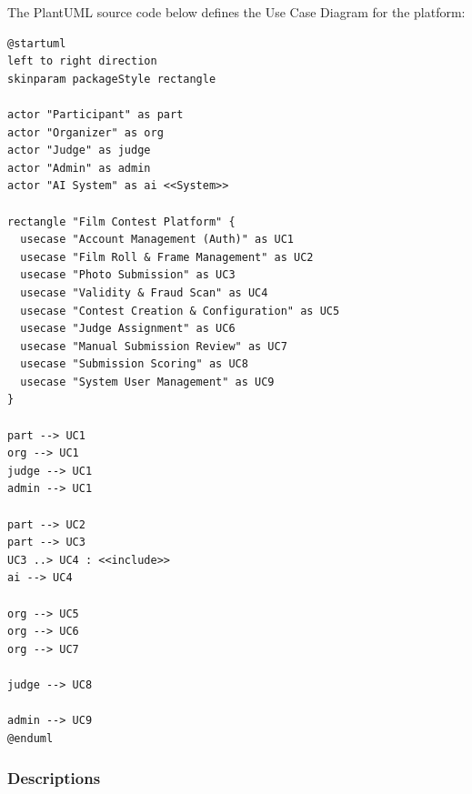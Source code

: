 \documentclass[12pt,a4paper]{article}
\begin{document}
The PlantUML source code below defines the Use Case Diagram for the platform:

\begin{lstlisting}[caption={Use Case Diagram Source Code (PlantUML)}]
@startuml
left to right direction
skinparam packageStyle rectangle

actor "Participant" as part
actor "Organizer" as org
actor "Judge" as judge
actor "Admin" as admin
actor "AI System" as ai <<System>>

rectangle "Film Contest Platform" {
  usecase "Account Management (Auth)" as UC1
  usecase "Film Roll & Frame Management" as UC2
  usecase "Photo Submission" as UC3
  usecase "Validity & Fraud Scan" as UC4
  usecase "Contest Creation & Configuration" as UC5
  usecase "Judge Assignment" as UC6
  usecase "Manual Submission Review" as UC7
  usecase "Submission Scoring" as UC8
  usecase "System User Management" as UC9
}

part --> UC1
org --> UC1
judge --> UC1
admin --> UC1

part --> UC2
part --> UC3
UC3 ..> UC4 : <<include>>
ai --> UC4

org --> UC5
org --> UC6
org --> UC7

judge --> UC8

admin --> UC9
@enduml
\end{lstlisting}

\subsubsection{Descriptions}
\end{document}
